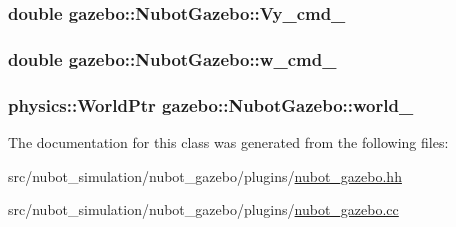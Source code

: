 \hypertarget{classgazebo_1_1NubotGazebo_a977c91e62fed23c5fb9233e5d38ad597}{
\subsubsection[{Vy\-\_\-cmd\-\_\-}]{\setlength{\rightskip}{0pt plus 5cm}double gazebo\-::\-Nubot\-Gazebo\-::\-Vy\-\_\-cmd\-\_\-\hspace{0.3cm}{\ttfamily [private]}}}\label{classgazebo_1_1NubotGazebo_a977c91e62fed23c5fb9233e5d38ad597}
\hypertarget{classgazebo_1_1NubotGazebo_aebc0851c9ab6da1d1c96d470e72758f8}{
\subsubsection[{w\-\_\-cmd\-\_\-}]{\setlength{\rightskip}{0pt plus 5cm}double gazebo\-::\-Nubot\-Gazebo\-::w\-\_\-cmd\-\_\-\hspace{0.3cm}{\ttfamily [private]}}}\label{classgazebo_1_1NubotGazebo_aebc0851c9ab6da1d1c96d470e72758f8}
\hypertarget{classgazebo_1_1NubotGazebo_aa56e5c10cfbbc981460ab1bcc204d071}{
\subsubsection[{world\-\_\-}]{\setlength{\rightskip}{0pt plus 5cm}physics\-::\-World\-Ptr gazebo\-::\-Nubot\-Gazebo\-::world\-\_\-\hspace{0.3cm}{\ttfamily [private]}}}\label{classgazebo_1_1NubotGazebo_aa56e5c10cfbbc981460ab1bcc204d071}


The documentation for this class was generated from the following files\-:\begin{DoxyCompactItemize}
\item 
src/nubot\-\_\-simulation/nubot\-\_\-gazebo/plugins/\hyperlink{nubot__gazebo_8hh}{nubot\-\_\-gazebo.\-hh}\item 
src/nubot\-\_\-simulation/nubot\-\_\-gazebo/plugins/\hyperlink{nubot__gazebo_8cc}{nubot\-\_\-gazebo.\-cc}\end{DoxyCompactItemize}
